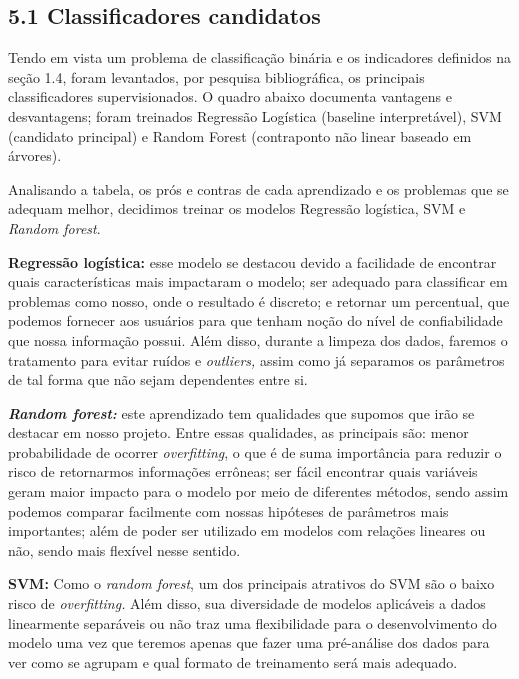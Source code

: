 \documentclass[
  brazilian,
  11pt,
]{article}
\begin{document}
\subsection{5.1 Classificadores candidatos}\label{classificadores-candidatos}

Tendo em vista um problema de classificação binária e os indicadores definidos na seção 1.4, foram levantados, por pesquisa bibliográfica, os principais classificadores supervisionados. O quadro abaixo documenta vantagens e desvantagens; foram treinados Regressão Logística (baseline interpretável), SVM (candidato principal) e Random Forest (contraponto não linear baseado em árvores).

Analisando a tabela, os prós e contras de cada aprendizado e os problemas que se adequam melhor, decidimos treinar os modelos Regressão logística, SVM e \emph{Random forest}.

\textbf{Regressão logística:} esse modelo se destacou devido a facilidade de encontrar quais características mais impactaram o modelo; ser adequado para classificar em problemas como nosso, onde o resultado é discreto; e retornar um percentual, que podemos fornecer aos usuários para que tenham noção do nível de confiabilidade que nossa informação possui. Além disso, durante a limpeza dos dados, faremos o tratamento para evitar ruídos e \emph{outliers,} assim como já separamos os parâmetros de tal forma que não sejam dependentes entre si.

\textbf{\emph{Random forest:}} este aprendizado tem qualidades que supomos que irão se destacar em nosso projeto. Entre essas qualidades, as principais são: menor probabilidade de ocorrer \emph{overfitting}, o que é de suma importância para reduzir o risco de retornarmos informações errôneas; ser fácil encontrar quais variáveis geram maior impacto para o modelo por meio de diferentes métodos, sendo assim podemos comparar facilmente com nossas hipóteses de parâmetros mais importantes; além de poder ser utilizado em modelos com relações lineares ou não, sendo mais flexível nesse sentido.

\textbf{SVM:} Como o \emph{random forest}, um dos principais atrativos do SVM são o baixo risco de \emph{overfitting.} Além disso, sua diversidade de modelos aplicáveis a dados linearmente separáveis ou não traz uma flexibilidade para o desenvolvimento do modelo uma vez que teremos apenas que fazer uma pré-análise dos dados para ver como se agrupam e qual formato de treinamento será mais adequado.
\end{document}
